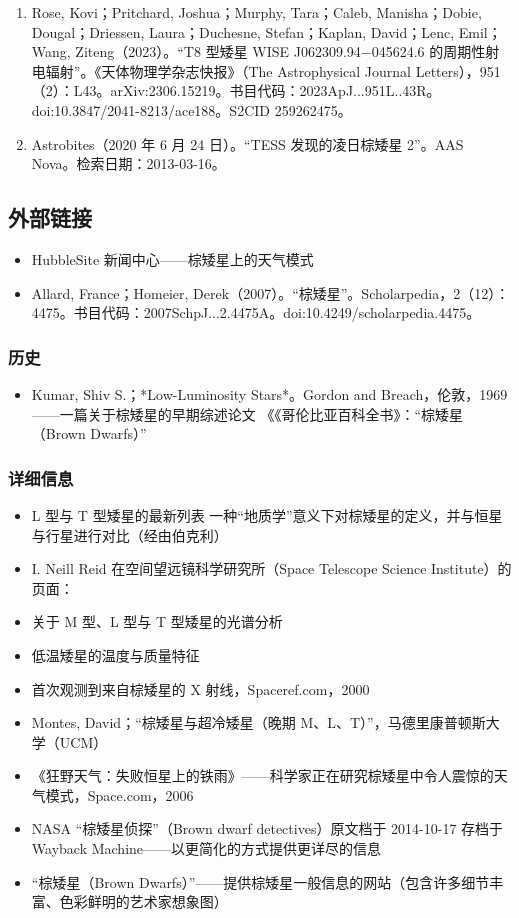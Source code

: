 \begin{enumerate}
\item Rose, Kovi；Pritchard, Joshua；Murphy, Tara；Caleb, Manisha；Dobie, Dougal；Driessen, Laura；Duchesne, Stefan；Kaplan, David；Lenc, Emil；Wang, Ziteng（2023）。“T8 型矮星 WISE J062309.94−045624.6 的周期性射电辐射”。《天体物理学杂志快报》（The Astrophysical Journal Letters），951（2）：L43。arXiv:2306.15219。书目代码：2023ApJ...951L..43R。doi:10.3847/2041-8213/ace188。S2CID 259262475。
\item Astrobites（2020 年 6 月 24 日）。“TESS 发现的凌日棕矮星 2”。AAS Nova。检索日期：2013-03-16。
\end{enumerate}
\subsection{外部链接}
\begin{itemize}
\item HubbleSite 新闻中心——棕矮星上的天气模式
\item Allard, France；Homeier, Derek（2007）。“棕矮星”。Scholarpedia，2（12）：4475。书目代码：2007SchpJ...2.4475A。doi:10.4249/scholarpedia.4475。
\end{itemize}
\subsubsection{历史}
\begin{itemize}
\item Kumar, Shiv S.；*Low-Luminosity Stars*。Gordon and Breach，伦敦，1969——一篇关于棕矮星的早期综述论文
《《哥伦比亚百科全书》：“棕矮星（Brown Dwarfs）”
\end{itemize}
\subsubsection{详细信息}
\begin{itemize}
\item L 型与 T 型矮星的最新列表
一种“地质学”意义下对棕矮星的定义，并与恒星与行星进行对比（经由伯克利）
\item I. Neill Reid 在空间望远镜科学研究所（Space Telescope Science Institute）的页面：
\item 关于 M 型、L 型与 T 型矮星的光谱分析
\item 低温矮星的温度与质量特征
\item 首次观测到来自棕矮星的 X 射线，Spaceref.com，2000
\item Montes, David；“棕矮星与超冷矮星（晚期 M、L、T）”，马德里康普顿斯大学（UCM）
\item 《狂野天气：失败恒星上的铁雨》——科学家正在研究棕矮星中令人震惊的天气模式，Space.com，2006
\item NASA “棕矮星侦探”（Brown dwarf detectives）原文档于 2014-10-17 存档于 Wayback Machine——以更简化的方式提供更详尽的信息
\item “棕矮星（Brown Dwarfs）”——提供棕矮星一般信息的网站（包含许多细节丰富、色彩鲜明的艺术家想象图）
\end{itemize}
